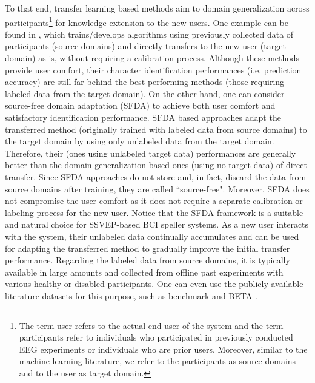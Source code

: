 \documentclass[12pt]{iopart}
\begin{document}
To that end, transfer learning based methods \cite{our_ensemble,tt-CCA} aim to domain generalization across participants\footnote{The term user refers to the actual end user of the system and the term participants refer to individuals who participated in previously conducted EEG experiments or individuals who are prior users. Moreover, similar to the machine learning literature, we refer to the participants as source domains and to the user as target domain.} for knowledge extension to the new users. One example can be found in \cite{our_ensemble}, which trains/develops algorithms using previously collected data of participants (source domains) and directly transfers to the new user (target domain) as is, without requiring a calibration process. Although these methods provide user comfort, their character identification performances (i.e. prediction accuracy) are still far behind the best-performing methods (those requiring labeled data from the target domain). On the other hand, one can consider source-free domain adaptation (SFDA) \cite{SFDA_EEG_privacy,SFDA_EEG2} to achieve both user comfort and satisfactory identification performance. SFDA based approaches adapt the transferred method (originally trained with labeled data from source domains) to the target domain by using only unlabeled data from the target domain. Therefore, their (ones using unlabeled target data) performances are generally better than the domain generalization based ones (using no target data) of direct transfer. Since SFDA approaches do not store and, in fact, discard the data from source domains after training, they are called ``source-free". Moreover, SFDA does not compromise the user comfort as it does not require a separate calibration or labeling process for the new user. Notice that the SFDA framework is a suitable and natural choice for SSVEP-based BCI speller systems. As a new user interacts with the system, their unlabeled data continually accumulates and can be used for adapting the transferred method to gradually improve the initial transfer performance. Regarding the labeled data from source domains, it is typically available in large amounts and collected from offline past experiments with various healthy or disabled participants. One can even use the publicly available literature datasets for this purpose, such as benchmark \cite{benchmark_Dataset} and BETA \cite{beta}.
\end{document}
